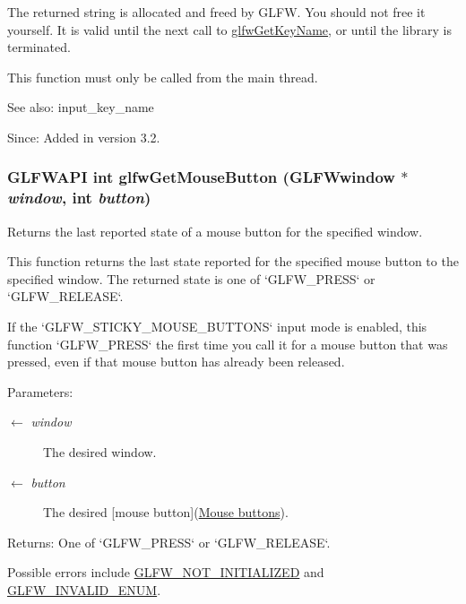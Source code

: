 The returned string is allocated and freed by GLFW. You should not free it yourself. It is valid until the next call to \hyperlink{group__input_g9323a397832dd03faa2a88534847c984}{glfwGetKeyName}, or until the library is terminated.

This function must only be called from the main thread.

\begin{Desc}
\item[See also:]input\_\-key\_\-name\end{Desc}
\begin{Desc}
\item[Since:]Added in version 3.2. \end{Desc}
\hypertarget{group__input_g6da5efb04f700c312a57a169fa9393a0}{
\subsubsection[glfwGetMouseButton]{\setlength{\rightskip}{0pt plus 5cm}GLFWAPI int glfwGetMouseButton ({\bf GLFWwindow} $\ast$ {\em window}, \/  int {\em button})}}
\label{group__input_g6da5efb04f700c312a57a169fa9393a0}


Returns the last reported state of a mouse button for the specified window. 

This function returns the last state reported for the specified mouse button to the specified window. The returned state is one of `GLFW\_\-PRESS` or `GLFW\_\-RELEASE`.

If the `GLFW\_\-STICKY\_\-MOUSE\_\-BUTTONS` input mode is enabled, this function `GLFW\_\-PRESS` the first time you call it for a mouse button that was pressed, even if that mouse button has already been released.

\begin{Desc}
\item[Parameters:]
\begin{description}
\item[\mbox{$\leftarrow$} {\em window}]The desired window. \item[\mbox{$\leftarrow$} {\em button}]The desired \mbox{[}mouse button\mbox{]}(\hyperlink{group__buttons}{Mouse buttons}). \end{description}
\end{Desc}
\begin{Desc}
\item[Returns:]One of `GLFW\_\-PRESS` or `GLFW\_\-RELEASE`.\end{Desc}
Possible errors include \hyperlink{group__errors_g2374ee02c177f12e1fa76ff3ed15e14a}{GLFW\_\-NOT\_\-INITIALIZED} and \hyperlink{group__errors_g76f6bb9c4eea73db675f096b404593ce}{GLFW\_\-INVALID\_\-ENUM}.

